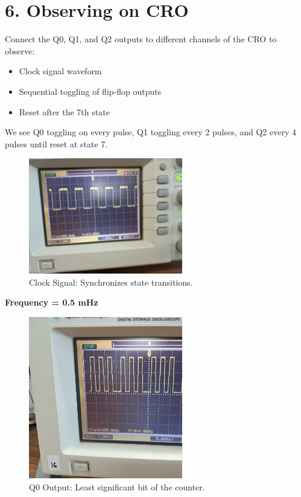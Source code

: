 \documentclass[a4paper,12pt]{article}
\begin{document}
\section*{6. Observing on CRO}
Connect the Q0, Q1, and Q2 outputs to different channels of the CRO to observe:
\begin{itemize}
    \item Clock signal waveform
    \item Sequential toggling of flip-flop outputs
    \item Reset after the 7th state
\end{itemize}

We see Q0 toggling on every pulse, Q1 toggling every 2 pulses, and Q2 every 4 pulses until reset at state 7.

\begin{figure}[H]
    \centering
    \includegraphics[width=0.6\textwidth]{figs/clock.jpeg} %
    \caption{Clock Signal: Synchronizes state transitions.}
    \label{fig:clock}
\end{figure}
\textbf{Frequency = 0.5 mHz}
\begin{figure}[H]
    \centering
    \includegraphics[width=0.6\textwidth]{figs/q0.jpeg} %
    \caption{Q0 Output: Least significant bit of the counter.}
    \label{fig:q0}
\end{figure}
\end{document}
